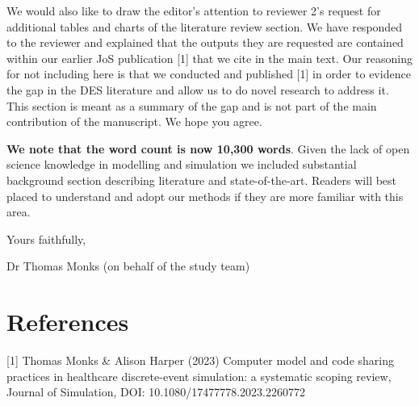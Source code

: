 \documentclass{article}
\begin{document}
We would also like to draw the editor's attention to reviewer 2's request for additional tables and charts of the literature review section.  We have responded to the reviewer and explained that the outputs they are requested are contained within our earlier JoS publication [1] that we cite in the main text. Our reasoning for not including here is that we conducted and published [1] in order to evidence the gap in the DES literature and allow us to do novel research to address it. This section is meant as a summary of the gap and is not part of the main contribution of the manuscript. We hope you agree.

\textbf{We note that the word count is now 10,300 words}.  Given the lack of open science knowledge in modelling and simulation we included substantial background section describing literature and state-of-the-art. Readers will best placed to understand and adopt our methods if they are more familiar with this area.

\vspace{0.2cm}


\noindent Yours faithfully,

\vspace{0.2cm}
\noindent Dr Thomas Monks (on behalf of the study team)

\section*{References}

[1] Thomas Monks \& Alison Harper (2023) Computer model and code sharing practices in healthcare discrete-event simulation: a systematic scoping review, Journal of Simulation, DOI: 10.1080/17477778.2023.2260772 
\end{document}
